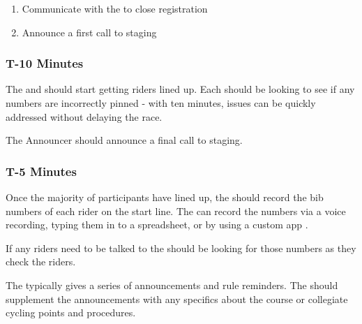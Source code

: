 \begin{enumerate}
  \item Communicate with the  to close registration%
  \item Announce a first call to staging%
\end{enumerate}

\subsubsection{T-10 Minutes}

The  and  should start getting riders lined up.
Each should be looking to see if any numbers are incorrectly pinned - with ten minutes, issues can be quickly addressed
without delaying the race.

The Announcer should announce a final call to staging.

\subsubsection{T-5 Minutes}

Once the majority of participants have lined up, the  should record the bib numbers
of each rider on the start line.
The  can record the numbers via a voice recording, typing them in to a spreadsheet,
or by using a custom app%
.

If any riders need to be talked to%
the  should be looking for those numbers as they check the riders.

The  typically gives a series of announcements and rule reminders.
The  should supplement the announcements with any specifics about the course or collegiate cycling points and procedures.
